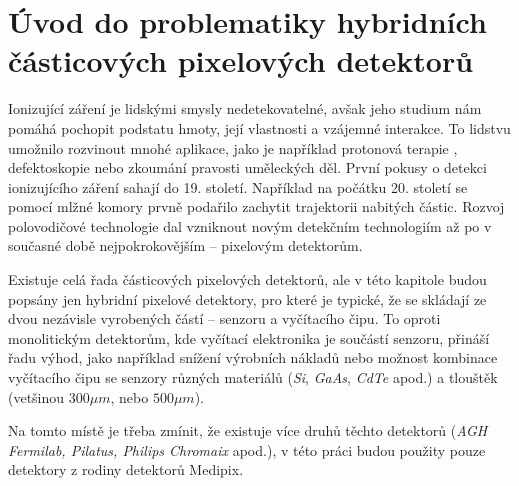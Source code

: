 

\chapter{Úvod do problematiky hybridních částicových pixelových detektorů}\label{chap:detectors}
Ionizující záření je lidskými smysly nedetekovatelné, avšak jeho studium nám pomáhá pochopit podstatu hmoty, její vlastnosti a vzájemné interakce. To lidstvu umožnilo rozvinout mnohé aplikace, jako je například protonová terapie \cite{tpx_app_radiotherapy}, defektoskopie nebo zkoumání pravosti uměleckých děl. První pokusy o detekci ionizujícího záření sahají do 19. století. Například na počátku 20. století se pomocí mlžné komory prvně podařilo zachytit trajektorii nabitých částic. Rozvoj polovodičové technologie dal vzniknout novým detekčním technologiím až po v současné době nejpokrokovějším -- pixelovým detektorům.%

Existuje celá řada částicových pixelových detektorů, ale v této kapitole budou popsány jen hybridní pixelové detektory, pro které je typické, že se skládají ze dvou nezávisle vyrobených částí -- senzoru a vyčítacího čipu. To oproti monolitickým detektorům, kde vyčítací elektronika je součástí senzoru, přináší řadu výhod, jako například snížení výrobních nákladů nebo možnost kombinace vyčítacího čipu se senzory různých materiálů (\textit{Si}, \textit{GaAs}, \textit{CdTe} apod.) a tlouštěk (vetšinou $300\mu m$, nebo $500\mu m$).

Na tomto místě je třeba zmínit, že existuje více druhů těchto detektorů (\textit{AGH Fermilab, Pilatus, Philips Chromaix} apod.)\cite{detectors_review}, v této práci budou použity pouze detektory z rodiny detektorů Medipix.

